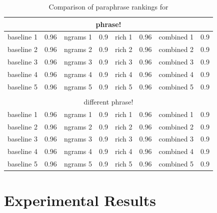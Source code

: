 \documentclass[11pt]{article}
\begin{document}
\begin{table}[t]
\small
\begin{center}
\begin{tabular}{|cl|cl|cl|cl|}
  \hline
  \multicolumn{8}{|c|}{phrase!} \\
  \hline
  baseline 1 & 0.96 &
  ngrams 1 & 0.9 &
  rich 1 & 0.96 &
  combined 1 & 0.9 \\

  baseline 2 & 0.96 &
  ngrams 2 & 0.9 &
  rich 2 & 0.96 &
  combined 2 & 0.9 \\

  baseline 3 & 0.96 &
  ngrams 3 & 0.9 &
  rich 3 & 0.96 &
  combined 3 & 0.9 \\


  baseline 4 & 0.96 &
  ngrams 4 & 0.9 &
  rich 4 & 0.96 &
  combined 4 & 0.9 \\


  baseline 5 & 0.96 &
  ngrams 5 & 0.9 &
  rich 5 & 0.96 &
  combined 5 & 0.9 \\

  \hline
  \multicolumn{8}{c}{} \\
  \hline
  \multicolumn{8}{|c|}{different phrase!} \\
  \hline
  baseline 1 & 0.96 &
  ngrams 1 & 0.9 &
  rich 1 & 0.96 &
  combined 1 & 0.9 \\

  baseline 2 & 0.96 &
  ngrams 2 & 0.9 &
  rich 2 & 0.96 &
  combined 2 & 0.9 \\

  baseline 3 & 0.96 &
  ngrams 3 & 0.9 &
  rich 3 & 0.96 &
  combined 3 & 0.9 \\


  baseline 4 & 0.96 &
  ngrams 4 & 0.9 &
  rich 4 & 0.96 &
  combined 4 & 0.9 \\


  baseline 5 & 0.96 &
  ngrams 5 & 0.9 &
  rich 5 & 0.96 &
  combined 5 & 0.9 \\

  \hline
\end{tabular}
\end{center}
\normalsize
\caption{Comparison of paraphrase rankings for }
\label{grammar_stats}
\end{table}



\section{Experimental Results}
\label{sec-results}
\end{document}
